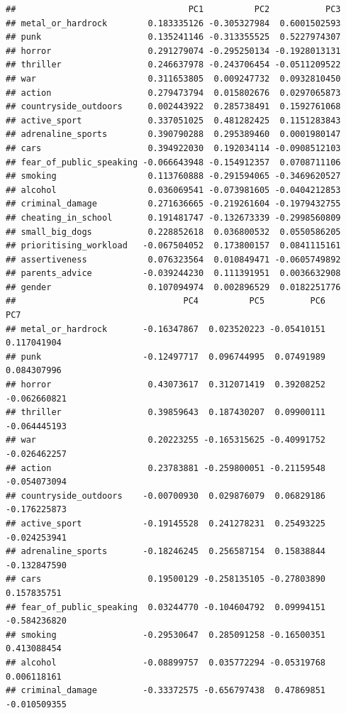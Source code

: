 \documentclass[]{article}
\begin{document}
\begin{verbatim}
##                                  PC1          PC2           PC3
## metal_or_hardrock        0.183335126 -0.305327984  0.6001502593
## punk                     0.135241146 -0.313355525  0.5227974307
## horror                   0.291279074 -0.295250134 -0.1928013131
## thriller                 0.246637978 -0.243706454 -0.0511209522
## war                      0.311653805  0.009247732  0.0932810450
## action                   0.279473794  0.015802676  0.0297065873
## countryside_outdoors     0.002443922  0.285738491  0.1592761068
## active_sport             0.337051025  0.481282425  0.1151283843
## adrenaline_sports        0.390790288  0.295389460  0.0001980147
## cars                     0.394922030  0.192034114 -0.0908512103
## fear_of_public_speaking -0.066643948 -0.154912357  0.0708711106
## smoking                  0.113760888 -0.291594065 -0.3469620527
## alcohol                  0.036069541 -0.073981605 -0.0404212853
## criminal_damage          0.271636665 -0.219261604 -0.1979432755
## cheating_in_school       0.191481747 -0.132673339 -0.2998560809
## small_big_dogs           0.228852618  0.036800532  0.0550586205
## prioritising_workload   -0.067504052  0.173800157  0.0841115161
## assertiveness            0.076323564  0.010849471 -0.0605749892
## parents_advice          -0.039244230  0.111391951  0.0036632908
## gender                   0.107094974  0.002896529  0.0182251776
##                                 PC4          PC5         PC6          PC7
## metal_or_hardrock       -0.16347867  0.023520223 -0.05410151  0.117041904
## punk                    -0.12497717  0.096744995  0.07491989  0.084307996
## horror                   0.43073617  0.312071419  0.39208252 -0.062660821
## thriller                 0.39859643  0.187430207  0.09900111 -0.064445193
## war                      0.20223255 -0.165315625 -0.40991752 -0.026462257
## action                   0.23783881 -0.259800051 -0.21159548 -0.054073094
## countryside_outdoors    -0.00700930  0.029876079  0.06829186 -0.176225873
## active_sport            -0.19145528  0.241278231  0.25493225 -0.024253941
## adrenaline_sports       -0.18246245  0.256587154  0.15838844 -0.132847590
## cars                     0.19500129 -0.258135105 -0.27803890  0.157835751
## fear_of_public_speaking  0.03244770 -0.104604792  0.09994151 -0.584236820
## smoking                 -0.29530647  0.285091258 -0.16500351  0.413088454
## alcohol                 -0.08899757  0.035772294 -0.05319768  0.006118161
## criminal_damage         -0.33372575 -0.656797438  0.47869851 -0.010509355

\end{verbatim}
\end{document}

